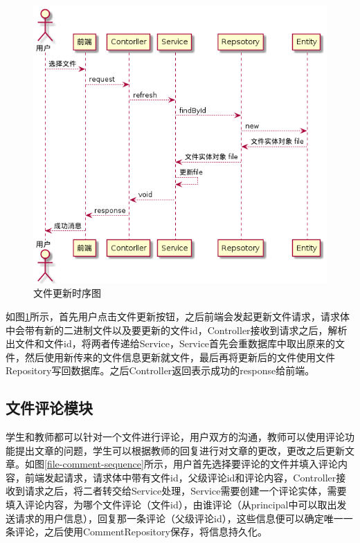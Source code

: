 \begin{figure}[ht]
    \centering
    \includegraphics[scale = 0.6]{out/uml/时序图/file-refresh-sequence/file-refresh-sequence.png}
    \caption{\song\wuhao 文件更新时序图}
    \label{file-refresh-sequence}
\end{figure}

如图\ref{file-refresh-sequence}所示，首先用户点击文件更新按钮，之后前端会发起更新文件请求，请求体中会带有新的二进制文件以及要更新的文件id，Controller接收到请求之后，解析出文件和文件id，将两者传递给Service，Service首先会重数据库中取出原来的文件，然后使用新传来的文件信息更新就文件，最后再将更新后的文件使用文件Repository写回数据库。之后Controller返回表示成功的response给前端。

\subsection{文件评论模块}

学生和教师都可以针对一个文件进行评论，用户双方的沟通，教师可以使用评论功能提出文章的问题，学生可以根据教师的回复进行对文章的更改，更改之后更新文章。如图\ref{file-comment-sequence}所示，用户首先选择要评论的文件并填入评论内容，前端发起请求，请求体中带有文件id，父级评论id和评论内容，Controller接收到请求之后，将二者转交给Service处理，Service需要创建一个评论实体，需要填入评论内容，为哪个文件评论（文件id），由谁评论（从principal中可以取出发送请求的用户信息），回复那一条评论（父级评论id），这些信息便可以确定唯一一条评论，之后使用CommentRepository保存，将信息持久化。

